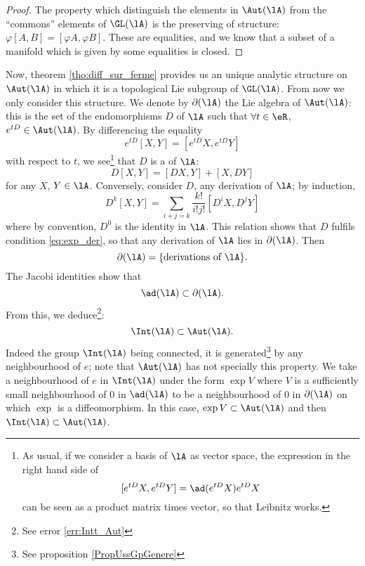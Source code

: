 \begin{proof}
The property which distinguish the elements in $\Aut(\lA)$ from the ``commons'' elements of $\GL(\lA)$ is the preserving of structure: $\varphi[A,B]=[\varphi A,\varphi B]$. These are equalities, and we know that a subset of a manifold which is given by some equalities is closed.
\end{proof}

Now, theorem \ref{tho:diff_sur_ferme} provides us an unique analytic structure on $\Aut(\lA)$ in which it is a topological Lie subgroup of $\GL(\lA)$. From now we only consider this structure. We denote by $\partial(\lA)$ the Lie algebra of $\Aut(\lA)$: this is the set of the endomorphisms $D$ of $\lA$ such that $\forall t\in\eR$, $e^{tD}\in\Aut(\lA)$. By differencing the equality
\begin{equation}\label{eq:exp_der}
  e^{tD}[X,Y]=[e^{tD}X,e^{tD}Y]
\end{equation}
with respect to $t$, we see\footnote{As usual, if we consider a basis of $\lA$ as vector space, the expression in the right hand side of \[[e^{tD}X,e^{tD}Y]=\ad(e^{tD}X)e^{tD}X\] can be seen as a product matrix times vector, so that Leibnitz works.} that $D$ is a  of $\lA$:
\begin{equation}
  D[X,Y]=[DX,Y]+[X,DY]
\end{equation}
for any $X$, $Y\in\lA$. Conversely, consider $D$, any derivation of $\lA$; by induction, 
\begin{equation}
   D^k[X,Y]=\sum_{i+j=k}\frac{k!}{i!j!}[D^iX,D^jY]
\end{equation}
where by convention, $D^0$ is the identity in $\lA$. This relation shows that $D$ fulfils condition \eqref{eq:exp_der}, so that any derivation of $\lA$ lies in $\partial(\lA)$. Then
\[
  \partial(\lA)=\{\text{derivations of }\lA\}.
\]
The Jacobi identities show that 
\[
\ad(\lA)\subset\partial(\lA).    \label{pg:ad_subset_der}
\]
From this, we deduce\footnote{See error \ref{err:Intt_Aut}}:
\begin{equation}\label{eq:int_sub_aut}
  \Int(\lA)\subset\Aut(\lA).
\end{equation}
Indeed the group $\Int(\lA)$ being connected, it is generated\footnote{See proposition \ref{PropUssGpGenere}} by any neighbourhood of $e$; note that $\Aut(\lA)$ has not specially this property. We take a neighbourhood of $e$ in $\Int(\lA)$ under the form  $\exp V$  where $V$ is a sufficiently small neighbourhood of $0$ in $\ad(\lA)$ to be a neighbourhood of $0$ in $\partial(\lA)$ on which $\exp$ is a diffeomorphism. In this case, $\exp V\subset\Aut(\lA)$ and then $\Int(\lA)\subset\Aut(\lA)$.

